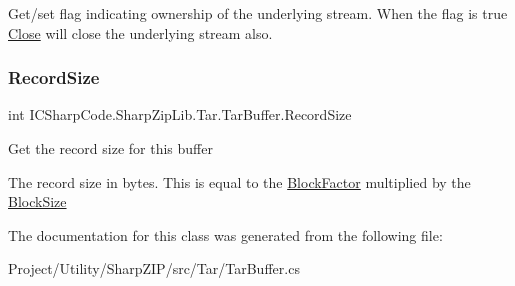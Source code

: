 Get/set flag indicating ownership of the underlying stream. When the flag is true \hyperlink{class_i_c_sharp_code_1_1_sharp_zip_lib_1_1_tar_1_1_tar_buffer_a3afc582eabfc493257c71e2fd317b3cc}{Close} will close the underlying stream also. 

\mbox{\label{class_i_c_sharp_code_1_1_sharp_zip_lib_1_1_tar_1_1_tar_buffer_adf7557320463a7ade141d2161cfacf38}} 
\subsubsection{\texorpdfstring{Record\+Size}{RecordSize}}
{\footnotesize\ttfamily int I\+C\+Sharp\+Code.\+Sharp\+Zip\+Lib.\+Tar.\+Tar\+Buffer.\+Record\+Size\hspace{0.3cm}{\ttfamily [get]}}



Get the record size for this buffer 

The record size in bytes. This is equal to the \hyperlink{class_i_c_sharp_code_1_1_sharp_zip_lib_1_1_tar_1_1_tar_buffer_add6a353dfa4c8321ccd5a5e54b7d5958}{Block\+Factor} multiplied by the \hyperlink{class_i_c_sharp_code_1_1_sharp_zip_lib_1_1_tar_1_1_tar_buffer_a99cabe6ecd1046ab392bd6ed33bda07a}{Block\+Size}

The documentation for this class was generated from the following file\+:\begin{DoxyCompactItemize}
\item 
Project/\+Utility/\+Sharp\+Z\+I\+P/src/\+Tar/Tar\+Buffer.\+cs\end{DoxyCompactItemize}

